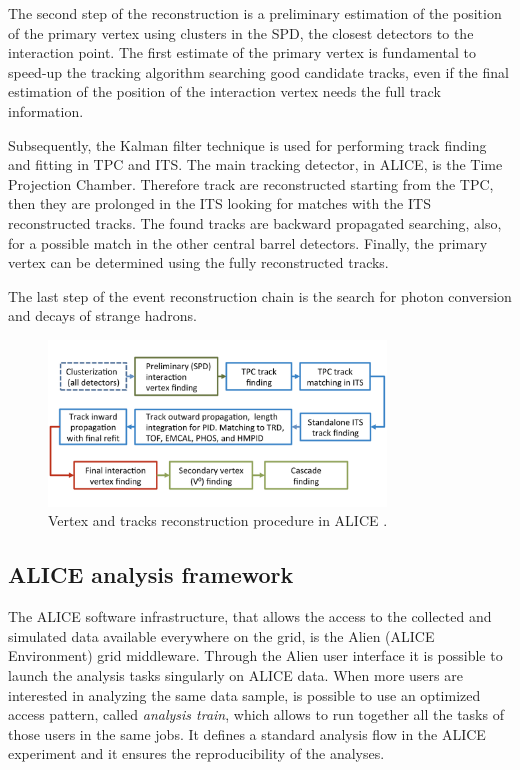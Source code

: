 The second step of the reconstruction is a preliminary estimation of the position of the primary
vertex using clusters in the SPD, the closest detectors to the interaction point.
The first estimate of the primary vertex is fundamental to speed-up the tracking algorithm searching
good candidate tracks, even if the final estimation of the position of the interaction vertex
needs the full track information.

Subsequently, the Kalman filter technique \cite{kalman} is used for performing track finding and
fitting in TPC and ITS. 
The main tracking detector, in ALICE, is the Time Projection Chamber. Therefore track are reconstructed 
starting from the TPC, then they are prolonged in the ITS looking for matches with the ITS 
reconstructed tracks. 
The found tracks are backward propagated searching, also, for a possible match in the other central
barrel detectors.
Finally, the primary vertex can be determined using the fully reconstructed tracks.

The last step of the event reconstruction chain is the search for photon conversion and decays of
strange hadrons.

\begin{figure}
    \captionsetup{justification=centering}
    \centering
    \includegraphics[width=0.8\textwidth]{gfx/reconstruction}
	\caption{Vertex and tracks reconstruction procedure in ALICE \cite{alice:Perf2014}.}
	\label{fig:reconstruction}
\end{figure}

%
\subsection{ALICE analysis framework} \label{sec:anal_frame}

The ALICE software infrastructure, that allows the access to the collected and simulated data 
available everywhere on the grid, is the Alien (ALICE Environment) \cite{alien} grid middleware.
Through the Alien user interface it is possible to launch the analysis tasks singularly on ALICE data. 
When more users are interested in analyzing the same data sample, is possible to use an optimized
access pattern, called \textit{analysis train}, which allows to run together all the tasks
of those users in the same jobs.
It defines a standard analysis flow in the ALICE experiment and it ensures the reproducibility of the
analyses.

